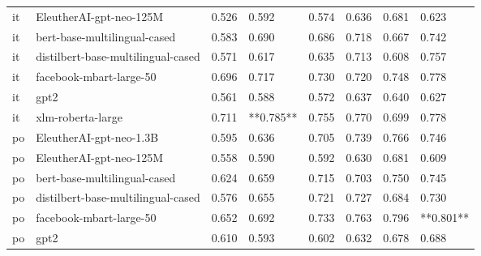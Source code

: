 \begin{tabular}{llllllll}
      it &            EleutherAI-gpt-neo-125M &     0.526 &                     0.592 &                 0.574 &                  0.636 &                                   0.681 &     0.623 \\
      it &       bert-base-multilingual-cased &     0.583 &                     0.690 &                 0.686 &                  0.718 &                                   0.667 &     0.742 \\
      it & distilbert-base-multilingual-cased &     0.571 &                     0.617 &                 0.635 &                  0.713 &                                   0.608 &     0.757 \\
      it &            facebook-mbart-large-50 &     0.696 &                     0.717 &                 0.730 &                  0.720 &                                   0.748 &     0.778 \\
      it &                               gpt2 &     0.561 &                     0.588 &                 0.572 &                  0.637 &                                   0.640 &     0.627 \\
      it &                  xlm-roberta-large &     0.711 &                 **0.785** &                 0.755 &                  0.770 &                                   0.699 &     0.778 \\
      po &            EleutherAI-gpt-neo-1.3B &     0.595 &                     0.636 &                 0.705 &                  0.739 &                                   0.766 &     0.746 \\
      po &            EleutherAI-gpt-neo-125M &     0.558 &                     0.590 &                 0.592 &                  0.630 &                                   0.681 &     0.609 \\
      po &       bert-base-multilingual-cased &     0.624 &                     0.659 &                 0.715 &                  0.703 &                                   0.750 &     0.745 \\
      po & distilbert-base-multilingual-cased &     0.576 &                     0.655 &                 0.721 &                  0.727 &                                   0.684 &     0.730 \\
      po &            facebook-mbart-large-50 &     0.652 &                     0.692 &                 0.733 &                  0.763 &                                   0.796 & **0.801** \\
      po &                               gpt2 &     0.610 &                     0.593 &                 0.602 &                  0.632 &                                   0.678 &     0.688 \\

\end{tabular}
